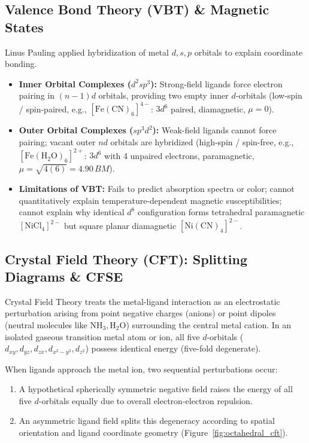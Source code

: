 \documentclass[10pt,twoside,openright]{book}
\begin{document}
\subsection{Valence Bond Theory (VBT) \& Magnetic States}
Linus Pauling applied hybridization of metal $d, s, p$ orbitals to explain coordinate bonding.
\begin{itemize}
  \item \textbf{Inner Orbital Complexes ($d^2sp^3$):} Strong-field ligands force electron pairing in $(n-1)d$ orbitals, providing two empty inner $d$-orbitals (low-spin / spin-paired, e.g., $[\mathrm{Fe(CN)_6}]^{4-}$: $3d^6$ paired, diamagnetic, $\mu = 0$).
  \item \textbf{Outer Orbital Complexes ($sp^3d^2$):} Weak-field ligands cannot force pairing; vacant outer $nd$ orbitals are hybridized (high-spin / spin-free, e.g., $[\mathrm{Fe(H_2O)_6}]^{2+}$: $3d^6$ with 4 unpaired electrons, paramagnetic, $\mu = \sqrt{4(6)} = 4.90\,\si{BM}$).
  \item \textbf{Limitations of VBT:} Fails to predict absorption spectra or color; cannot quantitatively explain temperature-dependent magnetic susceptibilities; cannot explain why identical $d^8$ configuration forms tetrahedral paramagnetic $[\mathrm{NiCl_4}]^{2-}$ but square planar diamagnetic $[\mathrm{Ni(CN)_4}]^{2-}$.
\end{itemize}

\subsection{Crystal Field Theory (CFT): Splitting Diagrams \& CFSE}
Crystal Field Theory treats the metal-ligand interaction as an electrostatic perturbation arising from point negative charges (anions) or point dipoles (neutral molecules like $\mathrm{NH_3, H_2O}$) surrounding the central metal cation. In an isolated gaseous transition metal atom or ion, all five $d$-orbitals ($d_{xy}, d_{yz}, d_{zx}, d_{x^2-y^2}, d_{z^2}$) possess identical energy (five-fold degenerate).

When ligands approach the metal ion, two sequential perturbations occur:
\begin{enumerate}
  \item A hypothetical spherically symmetric negative field raises the energy of all five $d$-orbitals equally due to overall electron-electron repulsion.
  \item An asymmetric ligand field splits this degeneracy according to spatial orientation and ligand coordinate geometry (Figure~\ref{fig:octahedral_cft}).
\end{enumerate}
\end{document}
